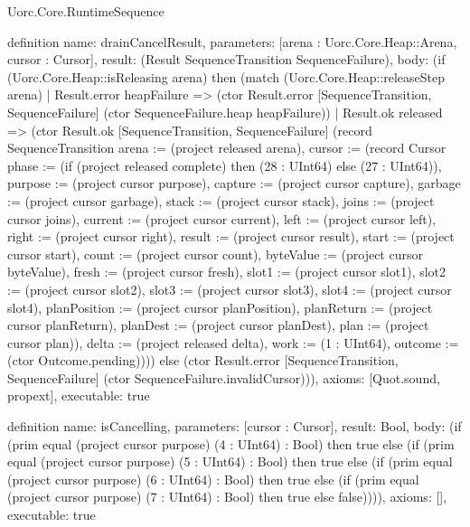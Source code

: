 \begin{lexlean}{Uorc.Core.RuntimeSequence}
\begin{semanticmodule}
definition{
  name: drainCancelResult,
  parameters: [arena : Uorc.Core.Heap::Arena, cursor : Cursor],
  result: (Result SequenceTransition SequenceFailure),
  body: (if (Uorc.Core.Heap::isReleasing arena) then (match (Uorc.Core.Heap::releaseStep arena)
    | Result.error heapFailure => (ctor Result.error [SequenceTransition, SequenceFailure] (ctor SequenceFailure.heap heapFailure))
    | Result.ok released => (ctor Result.ok [SequenceTransition, SequenceFailure] (record SequenceTransition {arena := (project released arena), cursor := (record Cursor {phase := (if (project released complete) then (28 : UInt64) else (27 : UInt64)), purpose := (project cursor purpose), capture := (project cursor capture), garbage := (project cursor garbage), stack := (project cursor stack), joins := (project cursor joins), current := (project cursor current), left := (project cursor left), right := (project cursor right), result := (project cursor result), start := (project cursor start), count := (project cursor count), byteValue := (project cursor byteValue), fresh := (project cursor fresh), slot1 := (project cursor slot1), slot2 := (project cursor slot2), slot3 := (project cursor slot3), slot4 := (project cursor slot4), planPosition := (project cursor planPosition), planReturn := (project cursor planReturn), planDest := (project cursor planDest), plan := (project cursor plan)}), delta := (project released delta), work := (1 : UInt64), outcome := (ctor Outcome.pending)}))) else (ctor Result.error [SequenceTransition, SequenceFailure] (ctor SequenceFailure.invalidCursor))),
  axioms: [Quot.sound, propext],
  executable: true
}

definition{
  name: isCancelling,
  parameters: [cursor : Cursor],
  result: Bool,
  body: (if (prim equal (project cursor purpose) (4 : UInt64) : Bool) then true else (if (prim equal (project cursor purpose) (5 : UInt64) : Bool) then true else (if (prim equal (project cursor purpose) (6 : UInt64) : Bool) then true else (if (prim equal (project cursor purpose) (7 : UInt64) : Bool) then true else false)))),
  axioms: [],
  executable: true
}


\end{semanticmodule}
\end{lexlean}
